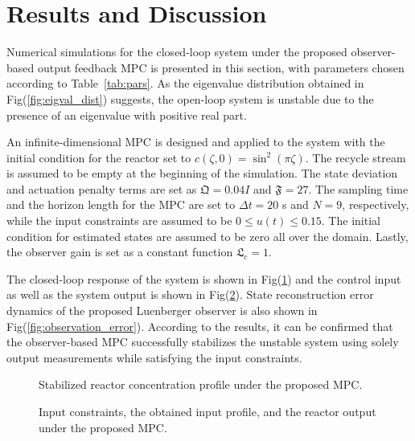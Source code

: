 \section{Results and Discussion}
Numerical simulations for the closed-loop system under the proposed observer-based output feedback MPC is presented in this section, with parameters chosen according to Table~\ref{tab:pars}. As the eigenvalue distribution obtained in Fig(\ref{fig:eigval_dist}) suggests, the open-loop system is unstable due to the presence of an eigenvalue with positive real part. 

An infinite-dimensional MPC is designed and applied to the system with the initial condition for the reactor set to $c(\zeta,0) = \sin^2(\pi \zeta)$. The recycle stream is assumed to be empty at the beginning of the simulation. The state deviation and actuation penalty terms are set as $\mathfrak{Q} = 0.04 I$ and $\mathfrak{F} = 27$. The sampling time and the horizon length for the MPC are set to $\Delta t = 20$ s and $N = 9$, respectively, while the input constraints are assumed to be $0 \leq u(t) \leq 0.15$. The initial condition for estimated states are assumed to be zero all over the domain. Lastly, the observer gain is set as a constant function $\mathfrak{L}_c = 1$. 

The closed-loop response of the system is shown in Fig(\ref{fig:closedloop_response}) and the control input as well as the system output is shown in Fig(\ref{fig:control_input}). State reconstruction error dynamics of the proposed Luenberger observer is also shown in Fig(\ref{fig:observation_error}). According to the results, it can be confirmed that the observer-based MPC successfully stabilizes the unstable system using solely output measurements while satisfying the input constraints.

\begin{figure}[!htbp]
    \centering
    
    \caption{Stabilized reactor concentration profile under the proposed MPC.}
    \label{fig:closedloop_response}
\end{figure}

\begin{figure}[!htbp]
    \centering
    
    \caption{Input constraints, the obtained input profile, and the reactor output under the proposed MPC.}
    \label{fig:control_input}
\end{figure}

